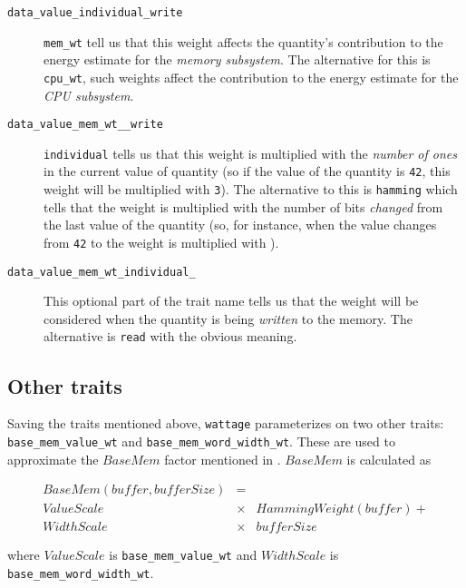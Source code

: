 \begin{description}
\item[\texttt{data\_value\_individual\_write}] \hfill

  \texttt{mem\_wt} tell us that this weight affects the quantity's
  contribution to the energy estimate for the \textit{memory
    subsystem}.  The alternative for this is \texttt{cpu\_wt}, such
  weights affect the contribution to the energy estimate for the
  \textit{CPU subsystem}.

\item[\texttt{data\_value\_mem\_wt\_\_write}] \hfill

  \texttt{individual} tells us that this weight is multiplied with the
  \textit{number of ones} in the current value of quantity (so if the
  value of the quantity is \texttt{42}, this weight will be multiplied
  with \texttt{3}).  The alternative to this is \texttt{hamming} which
  tells that the weight is multiplied with the number of bits
  \textit{changed} from the last value of the quantity (so, for
  instance, when the value changes from \texttt{42} to  the
  weight is multiplied with ).

\item[\texttt{data\_value\_mem\_wt\_individual\_}] \hfill

  This optional part of the trait name tells us that the weight will
  be considered when the quantity is being \textit{written} to the
  memory.  The alternative is \texttt{read} with the obvious meaning.
  
\end{description}

\subsection{Other traits}

Saving the traits mentioned above, \texttt{wattage} parameterizes on
two other traits: \texttt{base\_mem\_value\_wt} and
\texttt{base\_mem\_word\_width\_wt}.  These are used to approximate
the $BaseMem$ factor mentioned in \cite{steinke}.  $BaseMem$ is
calculated as

\begin{eqnarray*}
  BaseMem(buffer, bufferSize) &=& \\
          ValueScale &\times& HammingWeight(buffer) + \\
          WidthScale &\times& bufferSize
\end{eqnarray*}

where $ValueScale$ is \texttt{base\_mem\_value\_wt} and $WidthScale$
is \texttt{base\_mem\_word\_width\_wt}.

